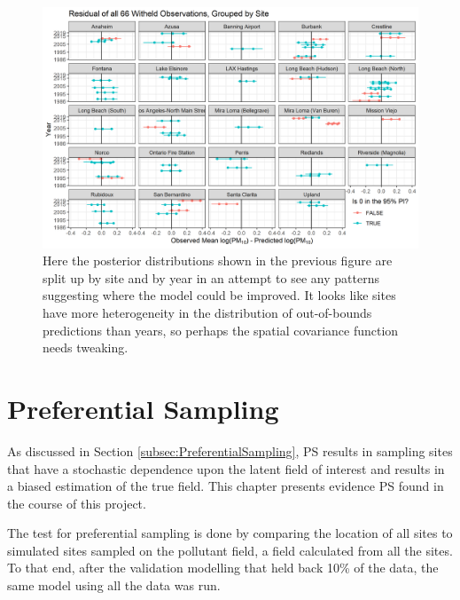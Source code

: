\begin{figure}[ht]
	\centering
	\includegraphics[width = \textwidth]{Figures/Validation/validate_delta_site.png}
	\caption{Here the posterior distributions shown in the previous figure are split up by site and by year in an attempt to see any patterns suggesting where the model could be improved.  It looks like sites have more heterogeneity in the distribution of out-of-bounds predictions than years, so perhaps the spatial covariance function needs tweaking.}
	\label{fig:validate_delta_site}
\end{figure}


%
\section{Preferential Sampling}
\label{sec:prefsamp}

As discussed in Section \ref{subsec:PreferentialSampling}, \ac{PS} results in sampling sites that have a stochastic dependence upon the latent field of interest and results in a biased estimation of the true field.  This chapter presents evidence  \ac{PS} found in the course of this project.

The test for preferential sampling is done by comparing the location of all sites to simulated sites sampled on the pollutant field, a field calculated from all the sites.  To that end, after the validation modelling that held back 10\% of the data, the same model using all the data was run.

